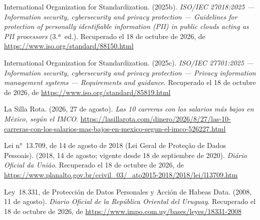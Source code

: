 \documentclass[12pt, a4paper]{article}
\begin{document}
\begin{list}{}{\setlength{\leftmargin}{1.27cm}\setlength{\itemindent}{-1.27cm}%
  \setlength{\labelwidth}{0pt}\setlength{\labelsep}{0pt}\setlength{\itemsep}{6pt}}
\item International Organization for Standardization. (2025b).
  \textit{ISO/IEC 27018:2025 --- Information security, cybersecurity
  and privacy protection --- Guidelines for protection of personally
  identifiable information (PII) in public clouds acting as PII
  processors} (3.ª~ed.).
  Recuperado el 18 de octubre de 2026, de \url{https://www.iso.org/standard/88150.html}
 

\item International Organization for Standardization. (2025c).
  \textit{ISO/IEC 27701:2025 --- Information security, cybersecurity
  and privacy protection --- Privacy information management
  systems --- Requirements and guidance}.
  Recuperado el 18 de octubre de 2026, de \url{https://www.iso.org/standard/85819.html}
 

\item La Silla Rota. (2026, 27 de agosto). \textit{Las 10 carreras con los
  salarios más bajos en México, según el IMCO}. \url{https://lasillarota.com/dinero/2026/8/27/las-10-carreras-con-los-salarios-mas-bajos-en-mexico-segun-el-imco-526227.html}
 

\item Lei n°~13.709, de 14 de agosto de 2018 (Lei Geral de
  Proteção de Dados Pessoais). (2018, 14 de agosto; vigente desde
  18 de septiembre de 2020). \textit{Diário Oficial da União}. Recuperado el 18 de octubre de 2026, de \url{https://www.planalto.gov.br/ccivil_03/_ato2015-2018/2018/lei/l13709.htm}


\item Ley~18.331, de Protección de Datos Personales y Acción de
  Habeas Data. (2008, 11 de agosto). \textit{Diario Oficial de la
  República Oriental del Uruguay}.
  Recuperado el 18 de octubre de 2026, de \url{https://www.impo.com.uy/bases/leyes/18331-2008}


\end{list}
\end{document}
